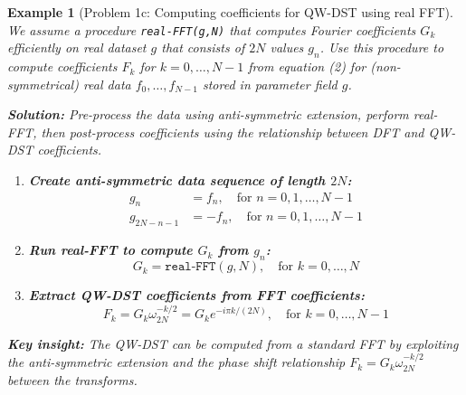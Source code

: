 \documentclass[11pt,a4paper]{article}
\newtheorem{example}[theorem]{Example}
\begin{document}
\begin{example}[Problem 1c: Computing coefficients for QW-DST using real FFT] 
We assume a procedure \texttt{real-FFT(g,N)} that computes Fourier coefficients $G_k$ efficiently on real dataset $g$ that consists of $2N$ values $g_n$. Use this procedure to compute coefficients $F_k$ for $k = 0,\ldots,N-1$ from equation (2) for (non-symmetrical) real data $f_0,\ldots,f_{N-1}$ stored in parameter field $g$.

  \textbf{Solution:} Pre-process the data using anti-symmetric extension, perform real-FFT, then post-process coefficients using the relationship between DFT and QW-DST coefficients.
  
  \begin{enumerate}
  \item \textbf{Create anti-symmetric data sequence of length $2N$:}
  \begin{align}
  g_n &= f_n, \quad \text{for } n = 0,1,\ldots,N-1\\
  g_{2N-n-1} &= -f_n, \quad \text{for } n = 0,1,\ldots,N-1
  \end{align}
  
  \item \textbf{Run real-FFT to compute $G_k$ from $g_n$:}
  $$G_k = \texttt{real-FFT}(g,N), \quad \text{for } k = 0,\ldots,N$$
  
  \item \textbf{Extract QW-DST coefficients from FFT coefficients:}
  $$F_k = G_k \omega_{2N}^{-k/2} = G_k e^{-i\pi k/(2N)}, \quad \text{for } k = 0,\ldots,N-1$$
  \end{enumerate}

  \textbf{Key insight:} The QW-DST can be computed from a standard FFT by exploiting the anti-symmetric extension and the phase shift relationship $F_k = G_k \omega_{2N}^{-k/2}$ between the transforms.
\end{example}
\end{document}
